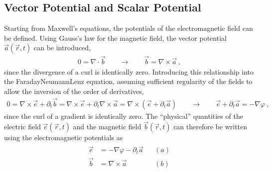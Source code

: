 \documentclass[letterpaper,10pt,english]{jupyterBook}
\begin{document}
\subsection{Vector Potential and Scalar Potential}
\label{\detokenize{ch/potentials:vector-potential-and-scalar-potential}}
\sphinxAtStartPar
Starting from Maxwell’s equations, the potentials of the electromagnetic field can be defined. Using Gauss’s law for the magnetic field, the vector potential \(\vec{a}(\vec{r},t)\) can be introduced,
\begin{equation*}
\begin{split}0 = \nabla \cdot \vec{b} \qquad \rightarrow \qquad \vec{b} = \nabla \times \vec{a} \ ,\end{split}
\end{equation*}
\sphinxAtStartPar
since the divergence of a curl is identically zero. Introducing this relationship into the Faraday\sphinxhyphen{}Neumann\sphinxhyphen{}Lenz equation, assuming sufficient regularity of the fields to allow the inversion of the order of derivatives,
\begin{equation*}
\begin{split}0 = \nabla \times \vec{e} + \partial_t \vec{b} = \nabla \times \vec{e} + \partial_t \nabla \times \vec{a} = \nabla \times (\vec{e} + \partial_t \vec{a}) \qquad \rightarrow \qquad \vec{e} + \partial_t \vec{a} = - \nabla \varphi \ ,\end{split}
\end{equation*}
\sphinxAtStartPar
since the curl of a gradient is identically zero. The “physical” quantities of the electric field \(\vec{e}(\vec{r},t)\) and the magnetic field \(\vec{b}(\vec{r},t)\) can therefore be written using the electromagnetic potentials as
\begin{equation}\label{equation:ch/potentials:eq:potentials}
\begin{split}\begin{aligned}
 \vec{e} & = - \nabla \varphi - \partial_t \vec{a} && (a) \\
 \vec{b} & = \nabla \times \vec{a} && (b) \\
\end{aligned}\end{split}
\end{equation}
\end{document}

